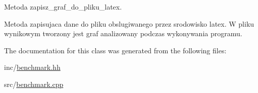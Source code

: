 Metoda zapisz\+\_\+graf\+\_\+do\+\_\+pliku\+\_\+latex. 

Metoda zapisujaca dane do pliku obslugiwanego przez srodowisko latex. W pliku wynikowym tworzony jest graf analizowany podczas wykonywania programu. 

The documentation for this class was generated from the following files\+:\begin{DoxyCompactItemize}
\item 
inc/\hyperlink{benchmark_8hh}{benchmark.\+hh}\item 
src/\hyperlink{benchmark_8cpp}{benchmark.\+cpp}\end{DoxyCompactItemize}
